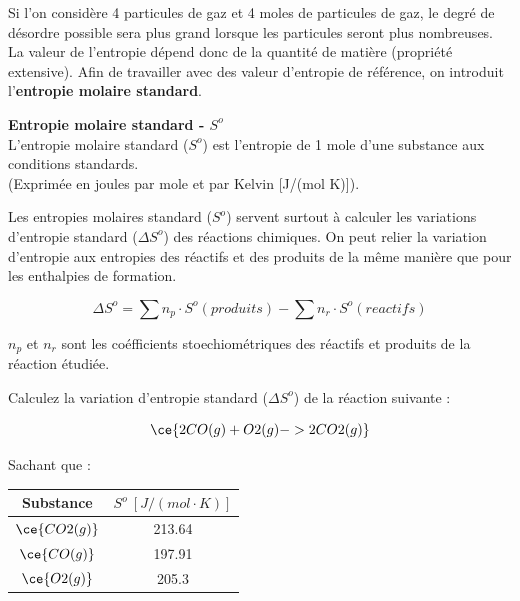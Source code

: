 \documentclass[
  11pt,
  a4paper,
  openany]{book}
\begin{document}
Si l'on considère 4 particules de gaz et 4 moles de particules de gaz, le degré de désordre possible sera plus grand lorsque les particules seront plus nombreuses. La valeur de l'entropie dépend donc de la quantité de matière (propriété extensive). Afin de travailler avec des valeur d'entropie de référence, on introduit l'\textbf{entropie molaire standard}.

\begin{tcolorbox}
\textbf{Entropie molaire standard - \(S^o\)}\\
L'entropie molaire standard (\(S^o\)) est l'entropie de 1 mole d'une substance aux conditions standards.\\
(Exprimée en joules par mole et par Kelvin {[}J/(mol K){]}).

\end{tcolorbox}

\clearpage

Les entropies molaires standard (\(S^{o}\)) servent surtout à calculer les variations d'entropie standard (\(\Delta S^{o}\)) des réactions chimiques. On peut relier la variation d'entropie aux entropies des réactifs et des produits de la même manière que pour les enthalpies de formation.

\[
\Delta S^o = \sum n_p \cdot S^{o}(produits) - \sum n_r \cdot S^{o}(reactifs)
\]

\(n_p\) et \(n_r\) sont les coéfficients stoechiométriques des réactifs et produits de la réaction étudiée.

\begin{Exercise}
Calculez la variation d'entropie standard (\(\Delta S^o\)) de la réaction suivante :

\[ \ce{2 CO(g) + O2(g) -> 2CO2(g)} \]

Sachant que :

\end{Exercise}

\begin{longtable}[]{@{}cc@{}}
\toprule\noalign{}
Substance & \(S^o\ [J/(mol \cdot K)]\) \\
\midrule\noalign{}
\endhead
\bottomrule\noalign{}
\endlastfoot
\(\ce{CO2(g)}\) & 213.64 \\
\(\ce{CO(g)}\) & 197.91 \\
\(\ce{O2(g)}\) & 205.3 \\
\end{longtable}

\end{document}
